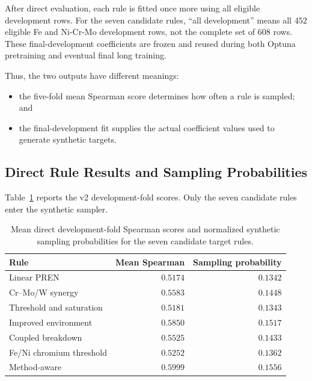 \documentclass{article}
\begin{document}
After direct evaluation, each rule is fitted once more using all eligible
development rows. For the seven candidate rules, ``all development'' means
all \(452\) eligible Fe and Ni-Cr-Mo development rows, not the complete set of
\(608\) rows. These final-development coefficients are frozen and reused
during both Optuna pretraining and eventual final long training.

Thus, the two outputs have different meanings:

\begin{itemize}
    \item the five-fold mean Spearman score determines how often a rule is
    sampled; and
    \item the final-development fit supplies the actual coefficient values used
    to generate synthetic targets.
\end{itemize}

\subsection{Direct Rule Results and Sampling Probabilities}
\label{sec:epit-rule-probabilities}

Table~\ref{tab:epit-rule-probabilities} reports the v2 development-fold scores.
Only the seven candidate rules enter the synthetic sampler.

\begin{table}[htbp]
\centering
\caption{Mean direct development-fold Spearman scores and normalized synthetic
sampling probabilities for the seven candidate target rules.}
\label{tab:epit-rule-probabilities}
\begin{tabular}{lrr}
\hline
Rule & Mean Spearman & Sampling probability \\
\hline
Linear PREN
    & \(0.5174\) & \(0.1342\) \\
Cr--Mo/W synergy
    & \(0.5583\) & \(0.1448\) \\
Threshold and saturation
    & \(0.5181\) & \(0.1343\) \\
Improved environment
    & \(0.5850\) & \(0.1517\) \\
Coupled breakdown
    & \(0.5525\) & \(0.1433\) \\
Fe/Ni chromium threshold
    & \(0.5252\) & \(0.1362\) \\
Method-aware
    & \(\mathbf{0.5999}\) & \(\mathbf{0.1556}\) \\
\hline
\end{tabular}
\end{table}
\end{document}
